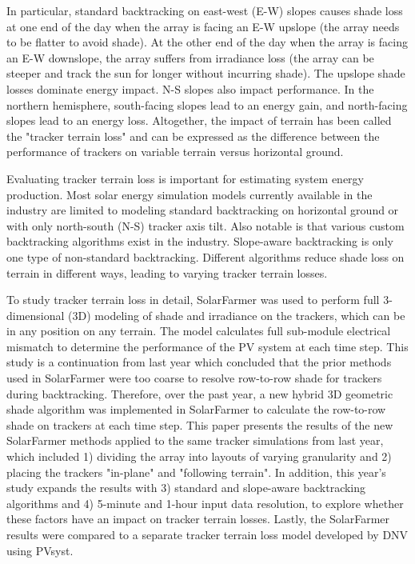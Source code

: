 \documentclass[conference]{IEEEtran}
\begin{document}
In particular, standard backtracking on east-west (E-W) slopes causes shade loss at one end of the day when the array is facing an E-W upslope (the array needs to be flatter to avoid shade). At the other end of the day when the array is facing an E-W downslope, the array suffers from irradiance loss (the array can be steeper and track the sun for longer without incurring shade). The upslope shade losses dominate energy impact. N-S slopes also impact performance. In the northern hemisphere, south-facing slopes lead to an energy gain, and north-facing slopes lead to an energy loss. Altogether, the impact of terrain has been called the "tracker terrain loss" and can be expressed as the difference between the performance of trackers on variable terrain versus horizontal ground. 

Evaluating tracker terrain loss is important for estimating system energy production. Most solar energy simulation models currently available in the industry are limited to modeling standard backtracking on horizontal ground or with only north-south (N-S) tracker axis tilt. Also notable is that various custom backtracking algorithms exist in the industry. Slope-aware backtracking is only one type of non-standard backtracking. Different algorithms reduce shade loss on terrain in different ways, leading to varying tracker terrain losses. 

To study tracker terrain loss in detail, SolarFarmer \cite{Mikofski_8547323} was used to perform full 3-dimensional (3D) modeling of shade and irradiance on the trackers, which can be in any position on any terrain. The model calculates full sub-module electrical mismatch to determine the performance of the PV system at each time step. This study is a continuation from last year \cite{Mikofski_9300381} which concluded that the prior methods used in SolarFarmer were too coarse to resolve row-to-row shade for trackers during backtracking. Therefore, over the past year, a new hybrid 3D geometric shade algorithm was implemented in SolarFarmer to calculate the row-to-row shade on trackers at each time step. This paper presents the results of the new SolarFarmer methods applied to the same tracker simulations from last year, which included 1) dividing the array into layouts of varying granularity and 2) placing the trackers "in-plane" and "following terrain". In addition, this year's study expands the results with 3) standard and slope-aware backtracking algorithms and 4) 5-minute and 1-hour input data resolution, to explore whether these factors have an impact on tracker terrain losses. Lastly, the SolarFarmer results were compared to a separate tracker terrain loss model developed by DNV using PVsyst. 
\end{document}
